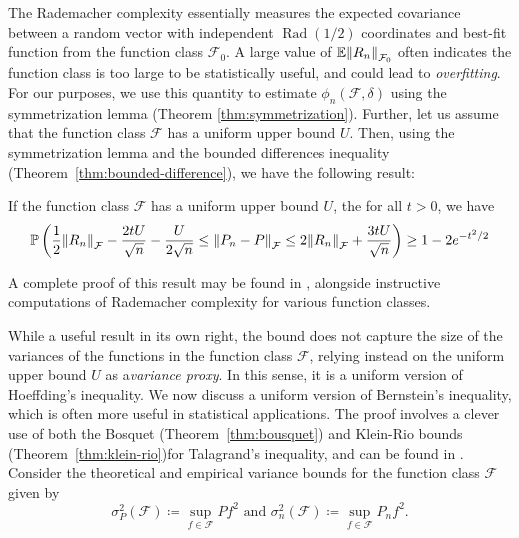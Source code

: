 The Rademacher complexity essentially measures the expected covariance between a random vector with independent $\operatorname{Rad}(1/2)$ coordinates and best-fit function from the function class $\mathcal{F}_0$. A large value of $\mathbb{E}\norm{R_n}_{\mathcal{F}_0}$ often indicates  the function class is too large to be statistically useful, and could lead to \emph{overfitting}. For our purposes, we use this quantity to estimate $\phi_n(\mathcal{F}, \delta)$ using the symmetrization lemma (Theorem \ref{thm:symmetrization}). Further, let us assume that the function class $\mathcal{F}$ has a uniform upper bound $U$. Then, using the symmetrization lemma and the bounded differences inequality (Theorem~\ref{thm:bounded-difference}), we have the following result:

\begin{theorem}\label{thm:emprisk-rc}
  If the function class $\mathcal{F}$ has a uniform upper bound $U$, the for all $t > 0$, we have
  \[
    \mathbb{P}\left(\frac{1}{2}\norm{R_n}_\mathcal{F} - \frac{2tU}{\sqrt{n}} - \frac{U}{2\sqrt{n}}\leq \norm{P_n - P}_\mathcal{F} \leq 2\norm{R_n}_\mathcal{F} + \frac{3tU}{\sqrt{n}}\right) \geq 1 - 2e^{-t^2/2}
  \]
\end{theorem}

A complete proof of this result may be found in \cite[Chapter~4]{wainwright2019high}, alongside instructive computations of Rademacher complexity for various function classes.

While a useful result in its own right, the bound does not capture the size of the variances of the functions in the function class $\mathcal{F}$, relying instead on the uniform upper bound $U$ as a\emph{variance proxy}. In this sense, it is a uniform version of Hoeffding's inequality. We now discuss a uniform version of Bernstein's inequality, which is often more useful in statistical applications. The proof involves a clever use of both the Bosquet (Theorem~\ref{thm:bousquet}) and Klein-Rio bounds (Theorem~\ref{thm:klein-rio})for Talagrand's inequality, and can be found in \cite{koltchinskii2008}. Consider the theoretical and empirical variance bounds for the function class $\mathcal{F}$ given by
\[\sigma^2_P(\mathcal{F}) \coloneqq \sup_{f \in \mathcal{F}} Pf^2 \text{ and } \sigma^2_n(\mathcal{F}) \coloneqq \sup_{f \in \mathcal{F}} P_nf^2.\]


